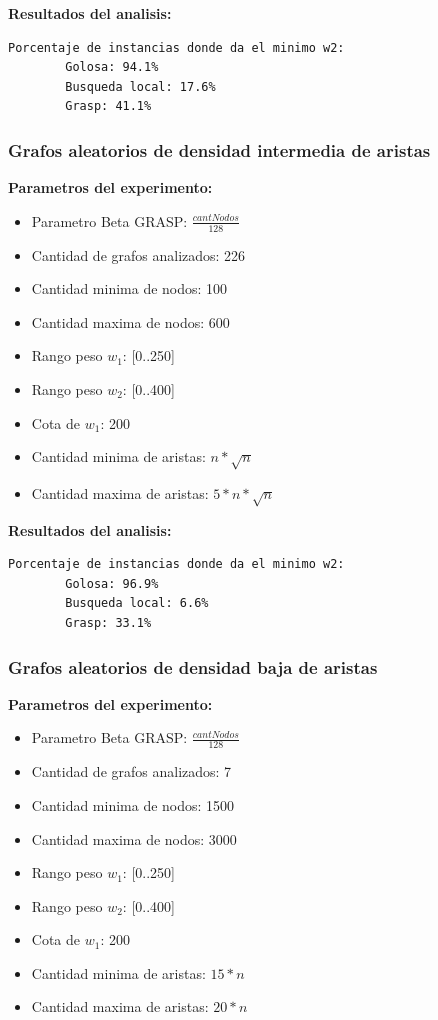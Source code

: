 \textbf{Resultados del analisis:}
\begin{lstlisting}[frame=single]	
	Porcentaje de instancias donde da el minimo w2:
        Golosa: 94.1%
        Busqueda local: 17.6%
        Grasp: 41.1%
\end{lstlisting}

\subsubsection{Grafos aleatorios de densidad intermedia de aristas}
\textbf{Parametros del experimento:}
\begin{itemize}
	\item Parametro Beta GRASP: $\frac{cantNodos}{128}$
	\item Cantidad de grafos analizados: 226
	\item Cantidad minima de nodos: 100
	\item Cantidad maxima de nodos: 600
	\item Rango peso $w_1$: [0..250]
	\item Rango peso $w_2$: [0..400]
	\item Cota de $w_1$: 200
	\item Cantidad minima de aristas: $ n * \sqrt n$
	\item Cantidad maxima de aristas: $ 5 * n * \sqrt n$
\end{itemize}

\textbf{Resultados del analisis:}
\begin{lstlisting}[frame=single]	
	Porcentaje de instancias donde da el minimo w2:
        Golosa: 96.9%
        Busqueda local: 6.6%
        Grasp: 33.1%
\end{lstlisting}

\subsubsection{Grafos aleatorios de densidad baja de aristas}
\textbf{Parametros del experimento:}
\begin{itemize}
	\item Parametro Beta GRASP: $\frac{cantNodos}{128}$
	\item Cantidad de grafos analizados: 7
	\item Cantidad minima de nodos: 1500
	\item Cantidad maxima de nodos: 3000
	\item Rango peso $w_1$: [0..250]
	\item Rango peso $w_2$: [0..400]
	\item Cota de $w_1$: 200
	\item Cantidad minima de aristas: $ 15*n$
	\item Cantidad maxima de aristas: $ 20*n$
\end{itemize}

